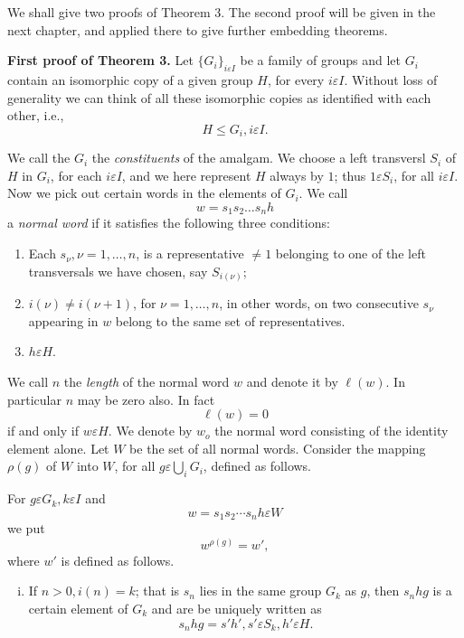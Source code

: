 We shall give two proofs of Theorem $3$. The second proof will be
given in the next chapter, and applied there to give further embedding
theorems. 

\noindent \textbf{First proof of Theorem 3.} Let $\{ G_i \}_{i
  \varepsilon I}$ be a family of groups and let $G_i$ contain an
isomorphic copy of a given group $H$, for every $i \varepsilon
I$. Without loss of generality we can think of all these isomorphic
copies as identified with each other, i.e., 
$$
H \leq G_i, i \varepsilon I.
$$

We call the $G_i$ the {\em constituents } of the amalgam. We choose a
left transversl $S_i$ of $H$ in $G_i$, for each $i \varepsilon I$, and
we here represent $H$ always by $1$; thus $1 \varepsilon S_i$, for all
$i \varepsilon I$. Now we pick out certain words in the elements of
$G_i$. We call  
$$
w = s_1 s_2 \ldots s_n h 
$$
a {\em normal word} if it satisfies the following three conditions:
\begin{enumerate}[1)]
\item Each $s_{\nu}, \nu = 1, \ldots, n$, is a representative $\neq 1$
  belonging to one of the left transversals we have chosen, say
  $S_{i(\nu)}$; 
\item $i(\nu) \neq i (\nu + 1)$, for $\nu = 1, \ldots,n$, in other
  words, on two  consecutive $s_{\nu}$ appearing in $w$ belong to the
  same set of representatives. 
\item $h \varepsilon H$.
\end{enumerate}

We call $n$ the \textit{ length } of the normal word $w$ and denote it
by $\ell (w)$. In particular $n$ may be zero also. In fact  
$$
\ell (w) = 0
$$
if and only if $w \varepsilon H$. We denote by $w_o$ the normal word
consisting of the identity element alone. Let $W$ be the set of all
normal words. Consider the mapping $\rho (g)$ of $W$ into $W$, for all
$g \varepsilon \bigcup \limits_i G_i$, defined as follows. 

For $g \varepsilon G_k, k \varepsilon I$ and 
$$
w = s_1 s_2 \cdots s_n h \varepsilon W
$$
we put 
$$
w^{\rho (g) } = w',
$$
where $w'$ is defined as follows.
\begin{enumerate}[(i)]
\item If $n > 0, i(n) = k $; that is $s_n$ lies in the same group
  $G_k$ as $g$, then $s_n hg$ is a certain element of $G_k$ and are be
  uniquely written as  
  $$
  s_n hg = s' h', s' \varepsilon S_k, h' \varepsilon H.
  $$
\end{enumerate} 
 
